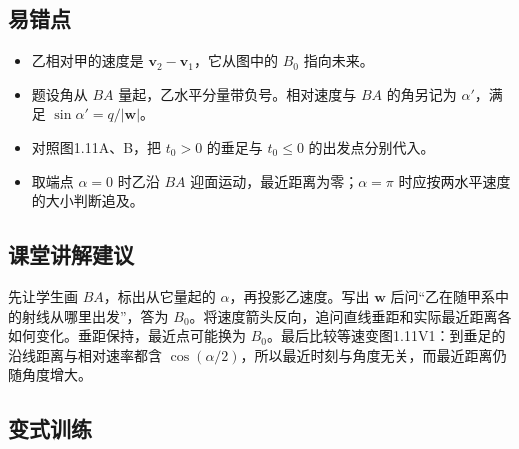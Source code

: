 \documentclass[UTF8,fontset=fandol,a4paper,11pt]{ctexart}
\newcommand{\vect}[1]{\bm{#1}}
\begin{document}
\subsection*{易错点}

\begin{itemize}
\item 乙相对甲的速度是 $\vect v_2-\vect v_1$，它从图中的 $B_0$ 指向未来。
\item 题设角从 $BA$ 量起，乙水平分量带负号。相对速度与 $BA$ 的角另记为 $\alpha'$，满足 $\sin\alpha'=q/|\vect w|$。
\item 对照图1.11A、B，把 $t_0>0$ 的垂足与 $t_0\leq0$ 的出发点分别代入。
\item 取端点 $\alpha=0$ 时乙沿 $BA$ 迎面运动，最近距离为零；$\alpha=\pi$ 时应按两水平速度的大小判断追及。
\end{itemize}



\subsection*{课堂讲解建议}

先让学生画 $BA$，标出从它量起的 $\alpha$，再投影乙速度。写出 $\vect w$ 后问“乙在随甲系中的射线从哪里出发”，答为 $B_0$。将速度箭头反向，追问直线垂距和实际最近距离各如何变化。垂距保持，最近点可能换为 $B_0$。最后比较等速变图1.11V1：到垂足的沿线距离与相对速率都含 $\cos(\alpha/2)$，所以最近时刻与角度无关，而最近距离仍随角度增大。



\subsection*{变式训练}
\end{document}
